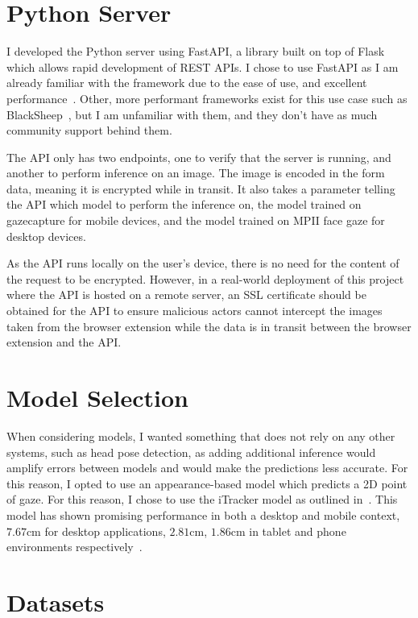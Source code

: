 \documentclass{report}
\begin{document}
\section{Python Server}

I developed the Python server using FastAPI, a library built on top of Flask which allows rapid development of REST APIs. I chose to use FastAPI as I am already familiar with the framework due to the ease of use, and excellent performance~\cite{klenov2015benchmark}. Other, more performant frameworks exist for this use case such as BlackSheep~\cite{prevato2018blacksheep}, but I am unfamiliar with them, and they don't have as much community support behind them.  

The API only has two endpoints, one to verify that the server is running, and another to perform inference on an image. The image is encoded in the form data, meaning it is encrypted while in transit. It also takes a parameter telling the API which model to perform the inference on, the model trained on gazecapture for mobile devices, and the model trained on MPII face gaze for desktop devices. 

As the API runs locally on the user's device, there is no need for the content of the request to be encrypted. However, in a real-world deployment of this project where the API is hosted on a remote server, an SSL certificate should be obtained for the API to ensure malicious actors cannot intercept the images taken from the browser extension while the data is in transit between the browser extension and the API. 


\section{Model Selection}

When considering models, I wanted something that does not rely on any other systems, such as head pose detection, as adding additional inference would amplify errors between models and would make the predictions less accurate. For this reason, I opted to use an appearance-based model which predicts a 2D point of gaze. For this reason, I chose to use the iTracker model as outlined in~\cite{krafka2016eye}. This model has shown promising performance in both a desktop and mobile context, \(7.67\text{cm}\) for desktop applications, \(2.81\text{cm}\), \(1.86\text{cm}\) in tablet and phone environments respectively~\cite{cheng2021survey}.

\section{Datasets}
\end{document}
